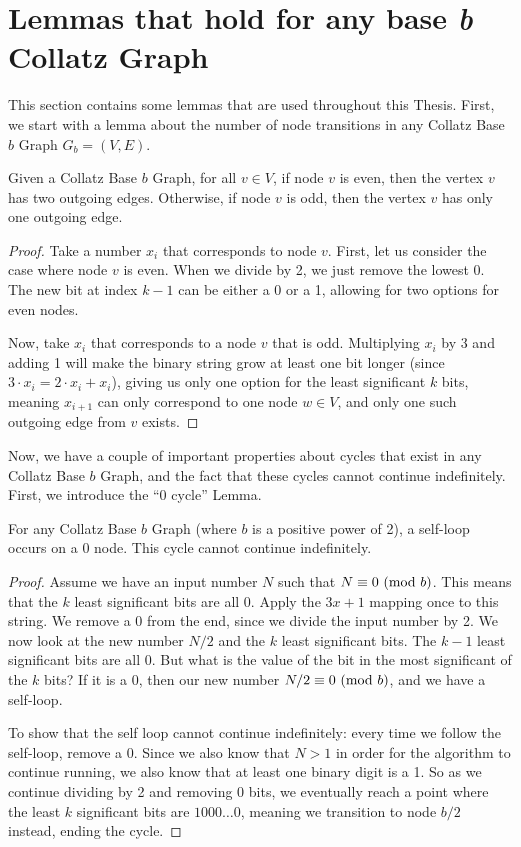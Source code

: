 \section{Lemmas that hold for any base \textit{b} Collatz Graph}
This section contains some lemmas that are used throughout this Thesis. First, we start with a lemma about the number of node transitions in any Collatz Base $b$ Graph $G_b= (V,E)$.
\begin{lemma}
\label{lem:numOutEdges}
Given a Collatz Base $b$ Graph, for all $v \in V$, if node $v$ is even, then the vertex $v$ has two outgoing edges. Otherwise, if node $v$ is odd, then the vertex $v$ has only one outgoing edge.
\end{lemma}
\begin{proof}
Take a number $x_i$ that corresponds to node $v$. First, let us consider the case where node $v$ is even. When we divide by 2, we just remove the lowest 0. The new bit at index $k-1$ can be either a 0 or a 1, allowing for two options for even nodes. \par
Now, take $x_i$ that corresponds to a node $v$ that is odd. Multiplying $x_i$ by 3 and adding 1 will make the binary string grow at least one bit longer (since $3\cdot x_i = 2 \cdot x_i + x_i$), giving us only one option for the least significant $k$ bits, meaning $x_{i+1}$ can only correspond to one node $w \in V$, and only one such outgoing edge from $v$ exists.
\end{proof}
Now, we have a couple of important properties about cycles that exist in any Collatz Base $b$ Graph, and the fact that these cycles cannot continue indefinitely. First, we introduce the ``0 cycle'' Lemma.
\begin{lemma}
\label{lem:zeroCycle}
For any Collatz Base $b$ Graph (where $b$ is a positive power of 2), a self-loop occurs on a 0 node. This cycle cannot continue indefinitely.
\end{lemma}
\begin{proof}
Assume we have an input number $N$ such that $N \equiv 0 \ (\mathrm{mod}\ b)$. This means that the $k$ least significant bits are all 0. Apply the $3x+1$ mapping once to this string. We remove a 0 from the end, since we divide the input number by 2. We now look at the new number $N/2$ and the $k$ least significant bits. The $k-1$ least significant bits are all 0. But what is the value of the bit in the most significant of the $k$ bits? If it is a 0, then our new number $N/2 \equiv 0 \ (\mathrm{mod}\ b)$, and we have a self-loop. \par
To show that the self loop cannot continue indefinitely: every time we follow the self-loop, remove a 0. Since we also know that $N > 1$ in order for the algorithm to continue running, we also know that at least one binary digit is a 1. So as we continue dividing by 2 and removing 0 bits, we eventually reach a point where the least $k$ significant bits are $1000\ldots 0$, meaning we transition to node $b/2$ instead, ending the cycle.
\end{proof}
